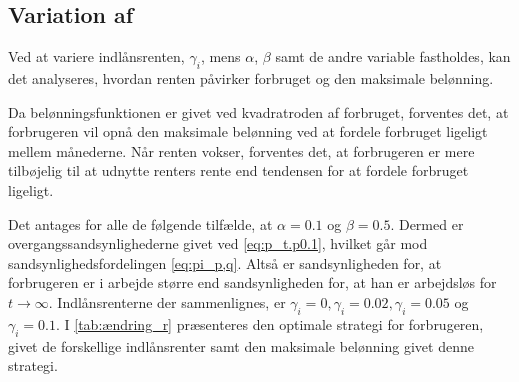 







\subsection[Variation af  \texorpdfstring{$\gamma_i$}{indlånsrenten}]{Variation af }

Ved at variere indlånsrenten, $\gamma_i$, mens $\alpha$, $\beta$ samt de andre variable fastholdes, kan det analyseres, hvordan renten påvirker forbruget og den maksimale belønning.

Da belønningsfunktionen er givet ved kvadratroden af forbruget, forventes det, at forbrugeren vil opnå den maksimale belønning ved at fordele forbruget ligeligt mellem månederne. Når renten vokser, forventes det, at forbrugeren er mere tilbøjelig til at udnytte renters rente end tendensen for at fordele forbruget ligeligt. 

Det antages for alle de følgende tilfælde, at $\alpha=0.1$ og $\beta=0.5$. Dermed er overgangssandsynlighederne givet ved \eqref{eq:p_t.p0.1}, hvilket går mod sandsynlighedsfordelingen \eqref{eq:pi_p,q}. Altså er sandsynligheden for, at forbrugeren er i arbejde større end sandsynligheden for, at han er arbejdsløs for $t\to\infty $. Indlånsrenterne der sammenlignes, er $\gamma_i = 0, \gamma_i=0.02, \gamma_i = 0.05$ og $\gamma_i = 0.1$. I \autoref{tab:ændring_r} præsenteres den optimale strategi for forbrugeren, givet de forskellige indlånsrenter samt den maksimale belønning givet denne strategi. 

